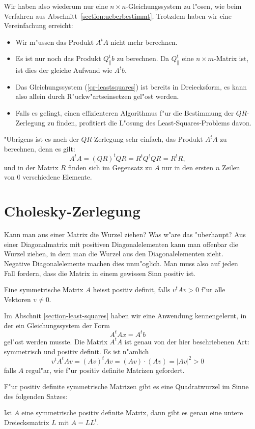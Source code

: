 Wir haben also wiederum nur eine $n\times n$-Gleichungssystem
zu l"osen, wie beim Verfahren aus Abschnitt~\ref{section:ueberbestimmt}.
Trotzdem haben wir eine Vereinfachung erreicht:
\begin{itemize}
\item Wir m"ussen das Produkt $A^tA$ nicht mehr berechnen.
\item Es ist nur noch das Produkt $Q_{\|}^tb$ zu berechnen.
Da $Q_{\|}^t$
eine $n\times m$-Matrix ist, ist dies der gleiche Aufwand wie $A^tb$.
\item Das Gleichungssystem (\ref{qr-leastsquares}) ist bereits in Dreiecksform,
es kann also allein durch R"uckw"artseinsetzen gel"ost werden.
\item Falls es gelingt, einen effizienteren Algorithmus f"ur die Bestimmung
der $QR$-Zerlegung zu finden, profitiert die L"osung des Least-Squares-Problems
davon.
\end{itemize}
"Ubrigens ist es nach der $QR$-Zerlegung sehr einfach, das Produkt $A^tA$
zu berechnen, denn es gilt:
\[
A^tA=(QR)^tQR=R^tQ^tQR=R^tR,
\]
und in der Matrix $R$ finden sich im Gegensatz zu $A$
nur in den ersten $n$ Zeilen von $0$ verschiedene Elemente.

\section{Cholesky-Zerlegung}
Kann man aus einer Matrix die Wurzel ziehen? Was w"are das "uberhaupt?
Aus einer Diagonalmatrix mit positiven Diagonalelementen kann man offenbar
die Wurzel ziehen, in dem man die Wurzel aus den Diagonalelementen zieht.
Negative Diagonalelemente machen dies unm"oglich.
Man muss also auf jeden
Fall fordern, dass die Matrix in einem gewissen Sinn positiv ist.

\begin{definition}
Eine symmetrische Matrix $A$ heisst positiv definit, falls $v^tAv>0$ f"ur
alle Vektoren $v\ne 0$.
\end{definition}

Im Abschnit \ref{section-least-squares} haben wir eine Anwendung
kennengelernt, in der ein Gleichungssystem der Form
\[
A^tAx=A^t b
\]
gel"ost werden musste.
Die Matrix $A^tA$ ist genau von der hier
beschriebenen Art: symmetrisch und positiv definit.
Es ist n"amlich
\[
v^tA^tAv=(Av)^tAv=(Av)\cdot (Av)=|Av|^2> 0
\]
falls $A$ regul"ar, wie f"ur positiv definite Matrizen gefordert.

F"ur positiv definite symmetrische Matrizen gibt es eine Quadratwurzel
im Sinne des folgenden Satzes:
\begin{satz}
Ist $A$ eine symmetrische positiv definite Matrix, dann gibt es genau eine
untere Dreiecksmatrix $L$ mit $A=LL^t$.
\end{satz}

